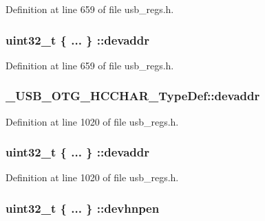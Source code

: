 Definition at line 659 of file usb\-\_\-regs.\-h.

\hypertarget{group___u_s_b___o_t_g___d_r_i_v_e_r_ga5961817cea81b5ad1cc5422104e566c4}{
\subsubsection[{devaddr}]{\setlength{\rightskip}{0pt plus 5cm}uint32\-\_\-t \{ ... \} \-::devaddr}}\label{group___u_s_b___o_t_g___d_r_i_v_e_r_ga5961817cea81b5ad1cc5422104e566c4}


Definition at line 659 of file usb\-\_\-regs.\-h.

\hypertarget{group___u_s_b___o_t_g___d_r_i_v_e_r_ga920950b9ba271e9946f53170718fef00}{
\subsubsection[{devaddr}]{ \-\_\-\-U\-S\-B\-\_\-\-O\-T\-G\-\_\-\-H\-C\-C\-H\-A\-R\-\_\-\-Type\-Def\-::devaddr}}\label{group___u_s_b___o_t_g___d_r_i_v_e_r_ga920950b9ba271e9946f53170718fef00}


Definition at line 1020 of file usb\-\_\-regs.\-h.

\hypertarget{group___u_s_b___o_t_g___d_r_i_v_e_r_ga7197e5da0a10dc8b6ddb74e421194390}{
\subsubsection[{devaddr}]{\setlength{\rightskip}{0pt plus 5cm}uint32\-\_\-t \{ ... \} \-::devaddr}}\label{group___u_s_b___o_t_g___d_r_i_v_e_r_ga7197e5da0a10dc8b6ddb74e421194390}


Definition at line 1020 of file usb\-\_\-regs.\-h.

\hypertarget{group___u_s_b___o_t_g___d_r_i_v_e_r_gaba577b3506c1ea8db4762964a86e9f39}{
\subsubsection[{devhnpen}]{\setlength{\rightskip}{0pt plus 5cm}uint32\-\_\-t \{ ... \} \-::devhnpen}}\label{group___u_s_b___o_t_g___d_r_i_v_e_r_gaba577b3506c1ea8db4762964a86e9f39}


